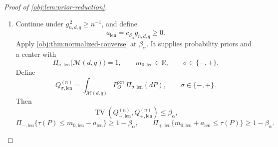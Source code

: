 \documentclass[11pt]{article}
\begin{document}
\begin{proof}[Proof of \cref{obj:lem:prior-reduction}]
\begin{enumerate}
\[\]
Each prior average is at most the worst-law risk, since its prior is
supported on \(\mathcal M(d,q)\). Hence
\[
2\sup_{P\in\mathcal M(d,q)}
  \mathbb E_P[(T(O^n)-\tau(P))^2]
\ge
\mathcal B_{-,\mathrm{pt}}(T)+\mathcal B_{+,\mathrm{pt}}(T)
\ge 2c_{\mathrm{sep,pt}}g_{n,d,q}^{\,2}.
\]
The estimator and target both lie in \([-1,1]\), so the squared loss lies
in \([0,4]\); these bounds justify the prior integrations and the finite
worst-law risks. The estimator class contains the constant zero estimator.
Taking its infimum as in \cref{obj:def:point-risk} proves
\[
\mathfrak R^*_{n,d,q}
\ge c_{\mathrm{sep,pt}}g_{n,d,q}^{\,2}
=\frac{13}{32}c_{\beta_0}^{\,2}g_{n,d,q}^{\,2}.
\]

\item Continue under \(g_{n,d,q}^{\,2}\ge n^{-1}\), and define
\[
a_{\mathrm{len}}=c_{\beta_\alpha}g_{n,d,q}\ge0.
\]
Apply \cref{obj:thm:normalized-converse} at \(\beta_\alpha\).
It supplies probability priors and a center with
\[
\Pi_{\sigma,\mathrm{len}}\bigl(\mathcal M(d,q)\bigr)=1,
\qquad
m_{0,\mathrm{len}}\in\mathbb R,
\qquad \sigma\in\{-,+\}.
\]
Define
\[
Q_{\sigma,\mathrm{len}}^{(n)}
=\int_{\mathcal M(d,q)}P_O^{\otimes n}\,
  \Pi_{\sigma,\mathrm{len}}(dP),
\qquad \sigma\in\{-,+\}.
\]
Then
\[
\operatorname{TV}\!\left(
Q_{-,\mathrm{len}}^{(n)},Q_{+,\mathrm{len}}^{(n)}
\right)\le\beta_\alpha,
\]
\[
\Pi_{-,\mathrm{len}}\{\tau(P)\le m_{0,\mathrm{len}}-a_{\mathrm{len}}\}
\ge1-\beta_\alpha,
\qquad
\Pi_{+,\mathrm{len}}\{m_{0,\mathrm{len}}+a_{\mathrm{len}}\le\tau(P)\}
\ge1-\beta_\alpha.
\]


\end{enumerate}
\end{proof}
\end{document}
